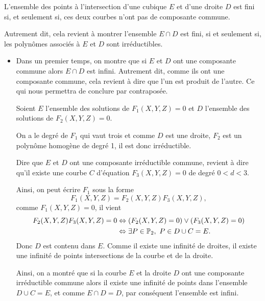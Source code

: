 \begin{proposition}
    \label{prop:intersectionED}
    
    L'ensemble des points à l'intersection d'une cubique $E$ et d'une droite $D$ est fini si, et
    seulement si, ces deux courbes n'ont pas de composante commune.
\end{proposition}

Autrement dit, cela revient à montrer l'ensemble $E \cap D$ est fini, si et seulement si, les
polynômes associés à $E$ et $D$ sont irréductibles. 

\begin{demonstration}
    \begin{itemize}
        \item 
    Dans un premier temps, on montre que si $E$ et $D$ ont une composante commune alors $E
    \cap D$ est infini. Autrement dit, comme ils ont une composante commune, cela revient à
    dire que l'un est produit de l'autre. Ce qui nous permettra de conclure par contraposée.

    Soient $E$ l'ensemble des solutions de $F_1(X,Y,Z) = 0$ et $D$ l'ensemble des solutions de
    $F_2(X,Y,Z) = 0$. 

    On a le degré de $F_1$ qui vaut trois et comme $D$ est une droite, $F_2$ est un polynôme
    homogène de degré 1, il est donc irréductible. 

    Dire que $E$ et $D$ ont une composante irréductible commune, revient à dire
    qu'il existe une courbe $C$ d'équation $F_3(X,Y,Z) = 0$ de degré $0<d<3$.

    Ainsi, on peut écrire $F_1$ sous la forme
    \[
    F_1(X,Y,Z) = F_2(X,Y,Z)F_3(X,Y,Z)
    ,\] 
    comme $F_1(X,Y,Z) = 0$, il vient 
    \begin{align*}
        F_2(X,Y,Z)F_3(X,Y,Z) = 0 & \Leftrightarrow \left( F_2(X,Y,Z)=0 \right)  \vee \left( F_3(X,Y,Z) = 0 \right)  \\
                                 & \Leftrightarrow \exists P \in \mathbb{P}_{2},\ P \in D \cup C = E 
    .\end{align*}
    Donc $D$ est contenu dans $E$. Comme il existe une infinité de droites, il existe une
    infinité de points intersections de la courbe et de la droite.

    Ainsi, on a montré que  si la courbe $E$ et la droite $D$ ont une composante irréductible
    commune alors il existe une infinité de points dans l'ensemble $D \cup C = E$, et
    comme $E \cap D = D$, par conséquent l'ensemble est infini.


\end{itemize}
\end{demonstration}
